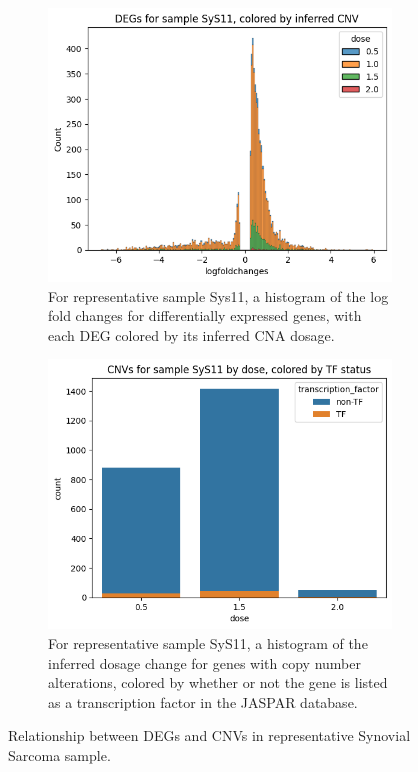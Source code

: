 \documentclass{article}
\begin{document}
\begin{figure}[h!]
     \centering
     \begin{subfigure}[b]{0.45\textwidth}
         \centering
         \includegraphics[width=\textwidth]{figures/sys11_deg_cnv_overlap.png}
         \caption{For representative sample Sys11, a histogram of the log fold changes for differentially expressed genes, with each DEG colored by its inferred CNA dosage.}
         \label{fig:lfc_cnv}
     \end{subfigure}
     \hfill
     \begin{subfigure}[b]{0.45\textwidth}
         \centering
         \includegraphics[width=\textwidth]{figures/sys11_cnv_tf_overlap.png}
         \caption{For representative sample SyS11, a histogram of the inferred dosage change for genes with copy number alterations, colored by whether or not the gene is listed as a transcription factor in the JASPAR database.}
         \label{fig:cnv_tf}
     \end{subfigure}
        \caption{Relationship between DEGs and CNVs in representative Synovial Sarcoma sample.}
        \label{fig:cnv_deg}
\end{figure}
\end{document}
